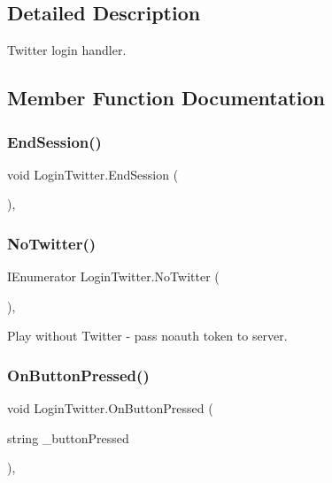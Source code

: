 \subsection{Detailed Description}
Twitter login handler. 

\subsection{Member Function Documentation}
\mbox{\label{class_login_twitter_ac489a3bf63140ddcc50d9a10f70409d1}} 
\subsubsection{\texorpdfstring{EndSession()}{EndSession()}}
{\footnotesize\ttfamily void Login\+Twitter.\+End\+Session (\begin{DoxyParamCaption}{ }\end{DoxyParamCaption})\hspace{0.3cm}{\ttfamily [inline]}, {\ttfamily [private]}}

\mbox{\label{class_login_twitter_af7789cc9f8f7b7b541b7b78ce125944b}} 
\subsubsection{\texorpdfstring{NoTwitter()}{NoTwitter()}}
{\footnotesize\ttfamily I\+Enumerator Login\+Twitter.\+No\+Twitter (\begin{DoxyParamCaption}{ }\end{DoxyParamCaption})\hspace{0.3cm}{\ttfamily [inline]}, {\ttfamily [private]}}



Play without Twitter -\/ pass noauth token to server. 

\mbox{\label{class_login_twitter_a93f9df661ee558c415ad4bd1aeea4555}} 
\subsubsection{\texorpdfstring{OnButtonPressed()}{OnButtonPressed()}}
{\footnotesize\ttfamily void Login\+Twitter.\+On\+Button\+Pressed (\begin{DoxyParamCaption}\item[{string}]{\+\_\+button\+Pressed }\end{DoxyParamCaption})\hspace{0.3cm}{\ttfamily [inline]}, {\ttfamily [private]}}



